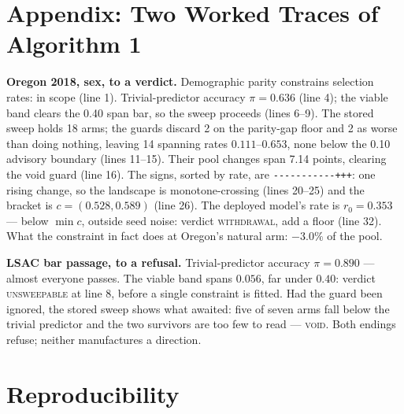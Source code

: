 \documentclass[conference]{IEEEtran}
\begin{document}
\section*{Appendix: Two Worked Traces of Algorithm 1}

\textbf{Oregon 2018, sex, to a verdict.} Demographic parity constrains selection rates:
in scope (line 1). Trivial-predictor accuracy $\pi = 0.636$ (line 4); the viable band
clears the 0.40 span bar, so the sweep proceeds (lines 6--9). The stored sweep holds 18
arms; the guards discard 2 on the parity-gap floor and 2 as worse than doing nothing,
leaving 14 spanning rates $0.111$--$0.653$, none below the 0.10 advisory boundary
(lines 11--15). Their pool changes span 7.14 points, clearing the void guard (line 16).
The signs, sorted by rate, are
\texttt{-{}-{}-{}-{}-{}-{}-{}-{}-{}-{}-{}+++}: one rising change, so the landscape is
monotone-crossing (lines 20--25) and the bracket is $c = (0.528, 0.589)$ (line 26). The
deployed model's rate is $r_0 = 0.353$ --- below $\min c$, outside seed noise: verdict
\textsc{withdrawal}, add a floor (line 32). What the constraint in fact does at Oregon's
natural arm: $-3.0\%$ of the pool.

\textbf{LSAC bar passage, to a refusal.} Trivial-predictor accuracy $\pi = 0.890$ ---
almost everyone passes. The viable band spans $0.056$, far under $0.40$: verdict
\textsc{unsweepable} at line 8, before a single constraint is fitted. Had the guard been
ignored, the stored sweep shows what awaited: five of seven arms fall below the trivial
predictor and the two survivors are too few to read --- \textsc{void}. Both endings
refuse; neither manufactures a direction.

\section*{Reproducibility}
\end{document}
